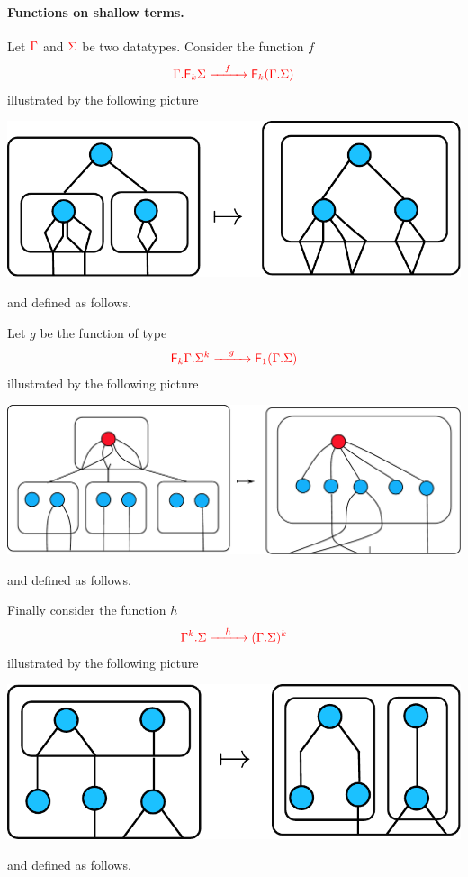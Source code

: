 \paragraph*{Functions on shallow terms.} Let ${\color{red}{\Gamma}}$ and ${\color{red}{\Sigma}}$ be two datatypes.  Consider the function $f$
\begin{align*}
{\color{red}{{\color{red}{\Gamma . {\color{red}{\mathsf F_{k}}}\Sigma}} \xrightarrow{\quad f\quad} {\color{red}{\mathsf F_{k}}}({\color{red}{\Gamma . \Sigma}})}} 
\end{align*}
illustrated by the following picture  
\begin{center}
\includegraphics[scale=.4]{pictures/shallow-fold-distrib}
\end{center}
and defined as follows. 

Let $g$ be the function of type
\begin{align*}
{\color{red}{{\color{red}{{\color{red}{\mathsf F_{k}}}\Gamma . \Sigma^k}} \xrightarrow{\quad g\quad} {\color{red}{\mathsf F_{1}}}({\color{red}{\Gamma . \Sigma}})}} 
\end{align*}
illustrated by the following picture  
\begin{center}
\includegraphics[scale=.37]{pictures/shallow-unfold}
\end{center}
and defined as follows. 

Finally consider the function $h$
\begin{align*}
{\color{red}{{\color{red}{\Gamma^k . \Sigma}} \xrightarrow{\quad h\quad} ({\color{red}{\Gamma . \Sigma}})^k}} 
\end{align*}
illustrated by the following picture  
\begin{center}
{\includegraphics[scale=.4]{pictures/tensor-shallow-distrib}}
\end{center}
and defined as follows. 

